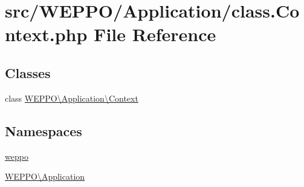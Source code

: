 \hypertarget{class_8Context_8php}{}\section{src/\+W\+E\+P\+P\+O/\+Application/class.Context.\+php File Reference}
\label{class_8Context_8php}
\subsection*{Classes}
\begin{DoxyCompactItemize}
\item 
class \hyperlink{classWEPPO_1_1Application_1_1Context}{W\+E\+P\+P\+O\textbackslash{}\+Application\textbackslash{}\+Context}
\end{DoxyCompactItemize}
\subsection*{Namespaces}
\begin{DoxyCompactItemize}
\item 
 \hyperlink{namespaceweppo}{weppo}
\item 
 \hyperlink{namespaceWEPPO_1_1Application}{W\+E\+P\+P\+O\textbackslash{}\+Application}
\end{DoxyCompactItemize}
